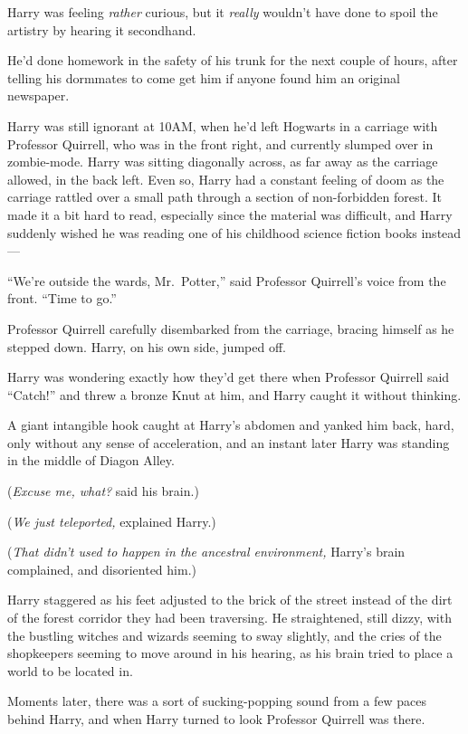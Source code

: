 Harry was feeling \emph{rather} curious, but it \emph{really} wouldn't
have done to spoil the artistry by hearing it secondhand.

He'd done homework in the safety of his trunk for the next couple of
hours, after telling his dormmates to come get him if anyone found him
an original newspaper.

Harry was still ignorant at 10AM, when he'd left Hogwarts in a carriage
with Professor Quirrell, who was in the front right, and currently
slumped over in zombie-mode. Harry was sitting diagonally across, as far
away as the carriage allowed, in the back left. Even so, Harry had a
constant feeling of doom as the carriage rattled over a small path
through a section of non-forbidden forest. It made it a bit hard to
read, especially since the material was difficult, and Harry suddenly
wished he was reading one of his childhood science fiction books
instead---

``We're outside the wards, Mr.~Potter,'' said Professor Quirrell's voice
from the front. ``Time to go.''

Professor Quirrell carefully disembarked from the carriage, bracing
himself as he stepped down. Harry, on his own side, jumped off.

Harry was wondering exactly how they'd get there when Professor Quirrell
said ``Catch!'' and threw a bronze Knut at him, and Harry caught it
without thinking.

A giant intangible hook caught at Harry's abdomen and yanked him back,
hard, only without any sense of acceleration, and an instant later Harry
was standing in the middle of Diagon Alley.

(\emph{Excuse me, what?} said his brain.)

(\emph{We just teleported,} explained Harry.)

(\emph{That didn't used to happen in the ancestral environment,} Harry's
brain complained, and disoriented him.)

Harry staggered as his feet adjusted to the brick of the street instead
of the dirt of the forest corridor they had been traversing. He
straightened, still dizzy, with the bustling witches and wizards seeming
to sway slightly, and the cries of the shopkeepers seeming to move
around in his hearing, as his brain tried to place a world to be located
in.

Moments later, there was a sort of sucking-popping sound from a few
paces behind Harry, and when Harry turned to look Professor Quirrell was
there.

